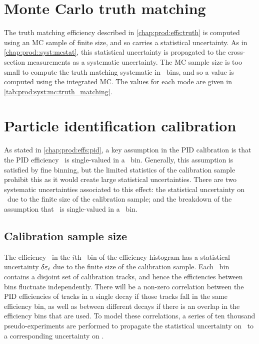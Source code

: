\section{Monte Carlo truth matching}
\label{chap:prod:syst:mc:truth_matching}

The truth matching efficiency described in \cref{chap:prod:effs:truth} is computed using an \ac{MC}
sample of finite size, and so carries a statistical uncertainty.
As in \cref{chap:prod::syst:mcstat}, this statistical uncertainty is propagated to the cross-section
measurements as a systematic uncertainty.
The \ac{MC} sample size is too small to compute the truth matching systematic
in \pTy\ bins, and so a value is computed using the integrated \ac{MC}.
The values for each mode are given in \cref{tab:prod:syst:mc:truth_matching}.

\section{Particle identification calibration}
\label{chap:prod:syst:pid}

As stated in \cref{chap:prod:effs:pid}, a key assumption in the \ac{PID}
calibration is that the \ac{PID} efficiency \effpid\ is single-valued in a
\ptotetanspd\ bin.
Generally, this assumption is satisfied by fine binning, but the limited
statistics of the calibration sample prohibit this as it would create large
statistical uncertainties.
There are two systematic uncertainties associated to this effect: the
statistical uncertainty on \effpid\ due to the finite size of the calibration
sample; and the breakdown of the assumption that \effpid\ is single-valued in a
\ptotetanspd\ bin.

\subsection{Calibration sample size}
\label{chap:prod:syst:pid:stat}

The efficiency \effi\ in the $i$th \ptotetanspd\ bin of the efficiency
histogram has a statistical uncertainty $\delta{\ensuremath{\varepsilon_{i}}}$ due to the finite size of
the calibration sample.
Each \ptotetanspd\ bin contains a disjoint set of calibration tracks, and hence
the efficiencies between bins fluctuate independently.
There will be a non-zero correlation between the \ac{PID} efficiencies of
tracks in a single decay if those tracks fall in the same efficiency bin, as
well as between different decays if there is an overlap in the efficiency bins
that are used.
To model these correlations, a series of ten thousand pseudo-experiments are
performed to propagate the statistical uncertainty on \effi\ to a corresponding
uncertainty on \effpid.

